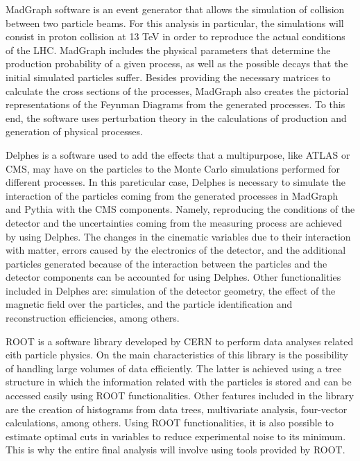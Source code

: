 \documentclass[12pt]{article}
\begin{document}
MadGraph software is an event generator that allows the simulation of collision between two particle beams. For this analysis in particular, the simulations will consist in proton collision at 13 TeV in order to reproduce the actual conditions of the LHC. MadGraph includes the physical parameters that determine the production probability of a given process, as well as the possible decays that the initial simulated particles suffer. Besides providing the necessary matrices to calculate the cross sections of the processes, MadGraph also creates the pictorial representations of the Feynman Diagrams from the generated processes. To this end, the software uses perturbation theory in the calculations of production and generation of physical processes. 

Delphes is a software used to add the effects that a multipurpose, like ATLAS or CMS, may have on the particles to the Monte Carlo simulations performed for different processes. In this pareticular case, Delphes is necessary to simulate the interaction of the particles coming from the generated processes in MadGraph and Pythia with the CMS components. Namely, reproducing the conditions of the detector and the uncertainties coming from the measuring process are achieved by using Delphes. The changes in the cinematic variables due to their interaction with matter, errors caused by the electronics of the detector, and the additional particles generated because of the interaction between the particles and the detector components can be accounted for using Delphes. Other functionalities included in Delphes are: simulation of the detector geometry, the effect of the magnetic field over the particles, and the particle identification and reconstruction efficiencies, among others. 

ROOT is a software library developed by CERN to perform data analyses related eith particle physics. On the main characteristics of this library is the possibility of handling large volumes of data efficiently. The latter is achieved using a tree structure in which the information related with the particles is stored and can be accessed easily using ROOT functionalities. Other features included in the library are the creation of histograms from data trees, multivariate analysis, four-vector calculations, among others. Using ROOT functionalities, it is also possible to estimate optimal cuts in variables to reduce experimental noise to its minimum. This is why the entire final analysis will involve using tools provided by ROOT.
\end{document}
